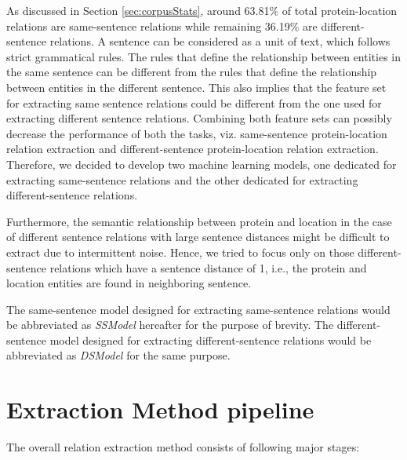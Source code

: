 As discussed in Section \ref{sec:corpusStats}, around 63.81\% of total protein-location relations are same-sentence relations while remaining 36.19\% are different-sentence relations. A sentence can be considered as a unit of text, which follows strict grammatical rules. The rules that define the relationship between entities in the same sentence can be different from the rules that define the relationship between entities in the different sentence. This also implies that the feature set for extracting same sentence relations could be different from the one used for extracting different sentence relations. Combining both feature sets can possibly decrease the performance of both the tasks, viz. same-sentence protein-location relation extraction and different-sentence protein-location relation extraction. Therefore, we decided to develop two machine learning models, one dedicated for extracting same-sentence relations and the other dedicated for extracting different-sentence relations.

Furthermore, the semantic relationship between protein and location in the case of different sentence relations with large sentence distances might be difficult to extract due to intermittent noise. Hence, we tried to focus only on those different-sentence relations which have a sentence distance of 1, i.e., the protein and location entities are found in neighboring sentence.

The same-sentence model designed for extracting same-sentence relations would be  abbreviated as \textit{SSModel} hereafter for the purpose of brevity. The different-sentence model designed for extracting different-sentence relations would be abbreviated as \textit{DSModel} for the same purpose.

\section{Extraction Method pipeline}\label{sec:pipeline}


The overall relation extraction method consists of following major stages:

